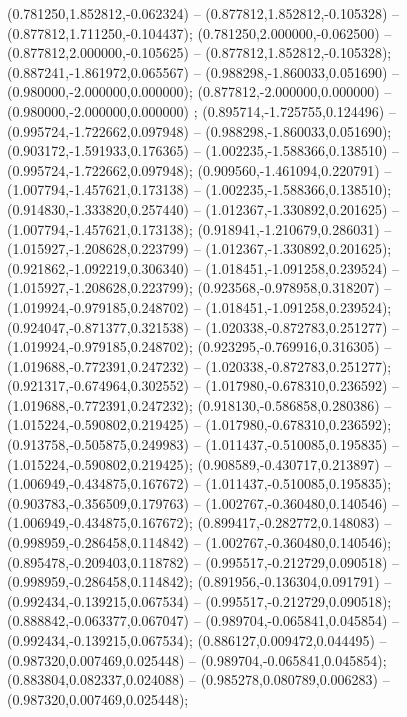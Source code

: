  (0.781250,1.852812,-0.062324) -- (0.877812,1.852812,-0.105328) -- (0.877812,1.711250,-0.104437);
 (0.781250,2.000000,-0.062500) -- (0.877812,2.000000,-0.105625) -- (0.877812,1.852812,-0.105328);
 (0.887241,-1.861972,0.065567) -- (0.988298,-1.860033,0.051690) -- (0.980000,-2.000000,0.000000);
 (0.877812,-2.000000,0.000000) -- (0.980000,-2.000000,0.000000) ;
 (0.895714,-1.725755,0.124496) -- (0.995724,-1.722662,0.097948) -- (0.988298,-1.860033,0.051690);
 (0.903172,-1.591933,0.176365) -- (1.002235,-1.588366,0.138510) -- (0.995724,-1.722662,0.097948);
 (0.909560,-1.461094,0.220791) -- (1.007794,-1.457621,0.173138) -- (1.002235,-1.588366,0.138510);
 (0.914830,-1.333820,0.257440) -- (1.012367,-1.330892,0.201625) -- (1.007794,-1.457621,0.173138);
 (0.918941,-1.210679,0.286031) -- (1.015927,-1.208628,0.223799) -- (1.012367,-1.330892,0.201625);
 (0.921862,-1.092219,0.306340) -- (1.018451,-1.091258,0.239524) -- (1.015927,-1.208628,0.223799);
 (0.923568,-0.978958,0.318207) -- (1.019924,-0.979185,0.248702) -- (1.018451,-1.091258,0.239524);
 (0.924047,-0.871377,0.321538) -- (1.020338,-0.872783,0.251277) -- (1.019924,-0.979185,0.248702);
 (0.923295,-0.769916,0.316305) -- (1.019688,-0.772391,0.247232) -- (1.020338,-0.872783,0.251277);
 (0.921317,-0.674964,0.302552) -- (1.017980,-0.678310,0.236592) -- (1.019688,-0.772391,0.247232);
 (0.918130,-0.586858,0.280386) -- (1.015224,-0.590802,0.219425) -- (1.017980,-0.678310,0.236592);
 (0.913758,-0.505875,0.249983) -- (1.011437,-0.510085,0.195835) -- (1.015224,-0.590802,0.219425);
 (0.908589,-0.430717,0.213897) -- (1.006949,-0.434875,0.167672) -- (1.011437,-0.510085,0.195835);
 (0.903783,-0.356509,0.179763) -- (1.002767,-0.360480,0.140546) -- (1.006949,-0.434875,0.167672);
 (0.899417,-0.282772,0.148083) -- (0.998959,-0.286458,0.114842) -- (1.002767,-0.360480,0.140546);
 (0.895478,-0.209403,0.118782) -- (0.995517,-0.212729,0.090518) -- (0.998959,-0.286458,0.114842);
 (0.891956,-0.136304,0.091791) -- (0.992434,-0.139215,0.067534) -- (0.995517,-0.212729,0.090518);
 (0.888842,-0.063377,0.067047) -- (0.989704,-0.065841,0.045854) -- (0.992434,-0.139215,0.067534);
 (0.886127,0.009472,0.044495) -- (0.987320,0.007469,0.025448) -- (0.989704,-0.065841,0.045854);
 (0.883804,0.082337,0.024088) -- (0.985278,0.080789,0.006283) -- (0.987320,0.007469,0.025448);
